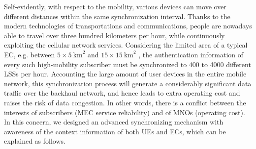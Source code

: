 \documentclass{ieeeaccess}
\newcommand{\change}[1]{#1}
\begin{document}
	Self-evidently, with respect to the mobility, various devices can move over different distances within the same synchronization interval. Thanks to the modern technologies of transportations and communications, people are nowadays able to travel over three hundred kilometers per hour, while continuously exploiting the cellular network services. Considering the limited area of a typical EC, e.g. between $5\times5~\text{km}^2$ and $15\times15~\text{km}^2$ \cite{checko2015cloud}, the authentication information of every such high-mobility subscriber must be synchronized to 400 to 4000 different LSSs per hour. Accounting the large amount of user devices in the entire mobile network, this synchronization process will generate a considerably significant data traffic over the backhaul network, and hence leads to extra operating cost and raises the risk of data congestion. In other words, there is a conflict between the interests of subscribers (MEC service reliability) and of MNOs (operating cost). In this concern, we designed an advanced synchronizing mechanism with awareness \change{of} the context information of both UEs and ECs, which can be explained as follows.
	
\end{document}
